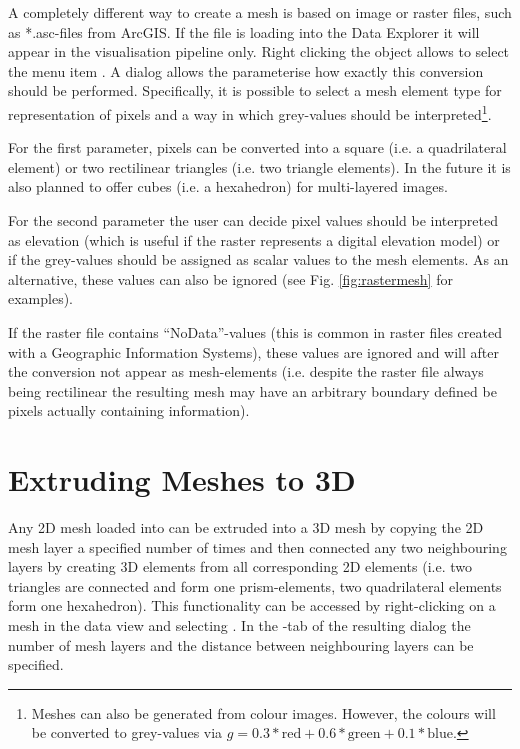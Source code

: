A completely different way to create a mesh is based on image or raster files, such as *.asc-files from ArcGIS. If the file is loading into the Data Explorer it will appear in the visualisation pipeline only. Right clicking the object allows to select the menu item . A dialog allows the parameterise how exactly this conversion should be performed. Specifically, it is possible to select a mesh element type for representation of pixels and a way in which grey-values should be interpreted\footnote{Meshes can also be generated from colour images. However, the colours will be converted to grey-values via $g = 0.3*\text{red}+0.6*\text{green}+0.1*\text{blue}$.}.

For the first parameter, pixels can be converted into a square (i.e. a quadrilateral element) or two rectilinear triangles (i.e. two triangle elements). In the future it is also planned to offer cubes (i.e. a hexahedron) for multi-layered images.

For the second parameter the user can decide pixel values should be interpreted as elevation (which is useful if the raster represents a digital elevation model) or if the grey-values should be assigned as scalar values to the mesh elements. As an alternative, these values can also be ignored (see Fig. \ref{fig:rastermesh} for examples).

If the raster file contains ``NoData''-values (this is common in raster files created with a Geographic Information Systems), these values are ignored and will after the conversion not appear as mesh-elements (i.e. despite the raster file always being rectilinear the resulting mesh may have an arbitrary boundary defined be pixels actually containing information).

\section{Extruding Meshes to 3D}

Any 2D mesh loaded into \ogs can be extruded into a 3D mesh by copying the 2D mesh layer a specified number of times and then connected any two neighbouring layers by creating 3D elements from all corresponding 2D elements (i.e. two triangles are connected and form one prism-elements, two quadrilateral elements form one hexahedron). This functionality can be accessed by right-clicking on a mesh in the data view and selecting . In the -tab of the resulting dialog the number of mesh layers and the distance between neighbouring layers can be specified.

